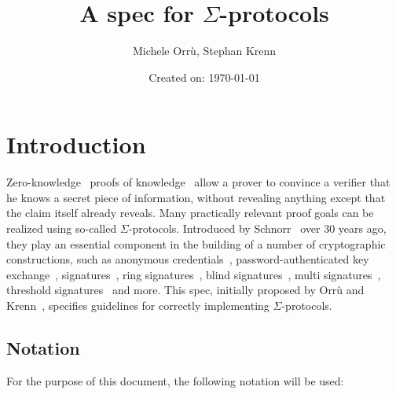 \documentclass[11pt]{article}
\title{A spec for $\Sigma$-protocols}
\date{Created on: \today}
\author{Michele Orrù, Stephan Krenn}
\begin{document}
%
\maketitle              %
%
{\hypersetup{hidelinks} \tableofcontents}

\section{Introduction}

Zero-knowledge~\cite{GolMicRac89} proofs of knowledge~\cite{C:BelGol92} allow a prover to convince a verifier that he knows a secret piece of information, without revealing anything except that the claim itself already reveals.
Many practically relevant proof goals can be realized using so-called $\Sigma$-protocols.
Introduced by Schnorr~\cite{JC:Schnorr91} over 30 years ago, they play an essential component in the building of a number of cryptographic
constructions,
such as anonymous credentials~\cite{CCS:ChaMeiZav14}, password-authenticated key exchange~\cite{jpake}, signatures~\cite{C:Schnorr89},
ring signatures~\cite{borromeansig}, blind signatures~\cite{CCS:PoiSte97}, multi signatures~\cite{CCS:NRSW20}, threshold signatures~\cite{EPRINT:KomGol20} and more. This spec, initially proposed by Orrù and Krenn~\cite{sigma-proposal}, specifies guidelines for correctly implementing $\Sigma$-protocols.

\subsection{Notation}
\label{sec:notation}

For the purpose of this document, the following notation will be used:
\end{document}

